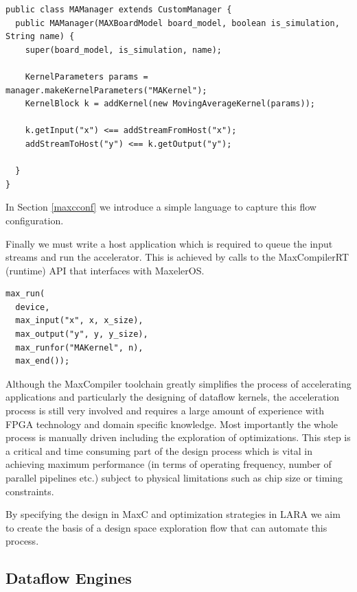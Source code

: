 
\begin{lstlisting}
public class MAManager extends CustomManager {
  public MAManager(MAXBoardModel board_model, boolean is_simulation, String name) {
    super(board_model, is_simulation, name);

    KernelParameters params = manager.makeKernelParameters("MAKernel");
    KernelBlock k = addKernel(new MovingAverageKernel(params));

    k.getInput("x") <== addStreamFromHost("x");
    addStreamToHost("y") <== k.getOutput("y");

  }
}
\end{lstlisting}

In Section \ref{maxcconf} we introduce a simple language to capture
this flow configuration.

Finally we must write a host application which is required to queue
the input streams and run the accelerator. This is achieved by calls
to the MaxCompilerRT (runtime) API that interfaces with MaxelerOS.


\begin{lstlisting}
max_run(
  device,
  max_input("x", x, x_size),
  max_output("y", y, y_size),
  max_runfor("MAKernel", n),
  max_end());
\end{lstlisting}


Although the MaxCompiler toolchain greatly simplifies the process of
accelerating applications and particularly the designing of dataflow
kernels, the acceleration process is still very involved and requires
a large amount of experience with FPGA technology and domain specific
knowledge. Most importantly the whole process is manually driven
including the exploration of optimizations. This step is a critical
and time consuming part of the design process which is vital in
achieving maximum performance (in terms of operating frequency, number
of parallel pipelines etc.) subject to physical limitations such as
chip size or timing constraints.

By specifying the design in MaxC and optimization strategies in LARA
we aim to create the basis of a design space exploration flow that can
automate this process.

\subsection{Dataflow Engines}

